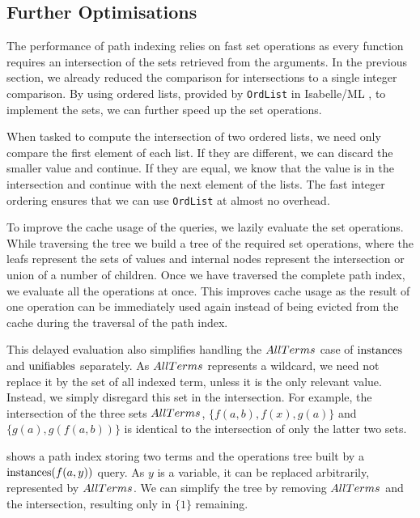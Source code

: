 \subsection{Further Optimisations}
The performance of path indexing relies on fast set operations as every function requires an intersection of the sets retrieved from the arguments. In the previous section, we already reduced the comparison for intersections to a single integer comparison. By using ordered lists, provided by \lstinline{OrdList} in Isabelle/ML \cite{noauthor_ord_listml_nodate}, to implement the sets, we can further speed up the set operations.

When tasked to compute the intersection of two ordered lists, we need only compare the first element of each list. If they are different, we can discard the smaller value and continue. If they are equal, we know that the value is in the intersection and continue with the next element of the lists. The fast integer ordering ensures that we can use \lstinline{OrdList} at almost no overhead.

To improve the cache usage of the queries, we lazily evaluate the set operations. While traversing the tree we build a tree of the required set operations, where the leafs represent the sets of values and internal nodes represent the intersection or union of a number of children. Once we have traversed the complete path index, we evaluate all the operations at once. This improves cache usage as the result of one operation can be immediately used again instead of being evicted from the cache during the traversal of the path index.

This delayed evaluation also simplifies handling the $AllTerms$ case of $\mathrm{instances}$ and $\mathrm{unifiables}$ separately. As $AllTerms$ represents a wildcard, we need not replace it by the set of all indexed term, unless it is the only relevant value. Instead, we simply disregard this set in the intersection. For example, the intersection of the three sets $AllTerms$, $\{f(a,b), f(x), g(a)\}$ and $\{g(a), g(f(a,b))\}$ is identical to the intersection of only the latter two sets.

 shows a path index storing two terms and the operations tree built by a $\mathrm{instances} (f(a,y))$ query. As $y$ is a variable, it can be replaced arbitrarily, represented by $AllTerms$. We can simplify the tree by removing $AllTerms$ and the intersection, resulting only in $\{1\}$ remaining.

